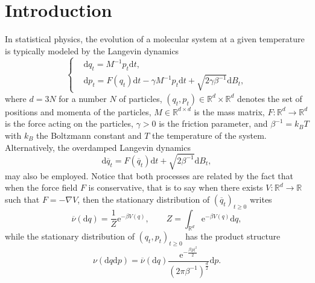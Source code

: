 \documentclass[preprint,EJP]{ejpecp}
\begin{document}
\section{Introduction} 
In statistical physics, the evolution of a molecular system at a given temperature is
typically modeled by the Langevin dynamics 
\begin{equation}\label{eq:Langevin_intro qsd}
  \left\{
    \begin{aligned}
        &\mathrm{d}q_t=M^{-1} p_t \mathrm{d}t , \\
        &\mathrm{d}p_t=F(q_t) \mathrm{d}t -\gamma M^{-1}  p_t
        \mathrm{d}t +\sqrt{2\gamma\beta^{-1}} \mathrm{d}B_t ,
    \end{aligned}
\right.  
\end{equation}
where $d=3N$ for a number $N$ of particles, $(q_t,p_t) \in \mathbb{R}^d \times \mathbb{R}^d$ denotes the set of positions and momenta of the
particles, $M \in \mathbb{R}^{d \times d}$ is the mass matrix,
$F:\mathbb{R}^d \to \mathbb{R}^d$ is the force acting on the particles, $\gamma >0$ is
the friction parameter, and $\beta^{-1}= k_B T$ with $k_B$
the Boltzmann constant and $T$
the temperature of the system. Alternatively, the overdamped Langevin dynamics
\begin{equation}\label{eq:ovLangevin_intro}
  \mathrm{d}\overline{q}_t = F(\overline{q}_t)\mathrm{d} t + \sqrt{2\beta^{-1}}\mathrm{d} B_t,
\end{equation}
may also be employed. Notice that both processes are related by the fact that when the force field $F$ is conservative, that is to say when there exists $V : \mathbb{R}^d \to \mathbb{R}$ such that $F = -\nabla V$, then the stationary distribution of $(\overline{q}_t)_{t \geq 0}$ writes
\begin{equation}\label{eq:nuovLangevin}
  \overline{\nu}(\mathrm{d}q) = \frac{1}{Z}\mathrm{e}^{-\beta V(q)}, \qquad Z = \int_{\mathbb{R}^d} \mathrm{e}^{-\beta V(q)} \mathrm{d}q,
\end{equation}
while the stationary distribution of $(q_t,p_t)_{t \geq 0}$ has the product structure
\begin{equation}\label{eq:nuLangevin}
  \nu(\mathrm{d}q\mathrm{d}p) = \overline{\nu}(\mathrm{d}q) \frac{\mathrm{e}^{-\frac{\beta\vert p\vert^2}{2}}}{(2\pi\beta^{-1})^{\frac{d}{2}}}\mathrm{d}p.
\end{equation} 
\end{document}
